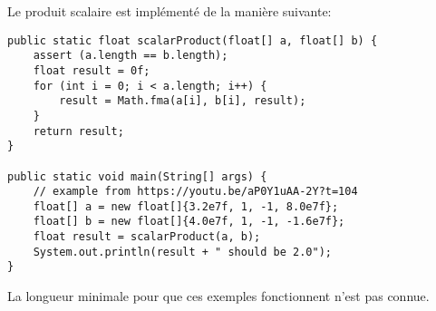 \begin{minipage2}
Le produit scalaire est implémenté de la manière suivante:

\begin{verbatim}
public static float scalarProduct(float[] a, float[] b) {
    assert (a.length == b.length);
    float result = 0f;
    for (int i = 0; i < a.length; i++) {
        result = Math.fma(a[i], b[i], result);
    }
    return result;
}

public static void main(String[] args) {
    // example from https://youtu.be/aP0Y1uAA-2Y?t=104
    float[] a = new float[]{3.2e7f, 1, -1, 8.0e7f};
    float[] b = new float[]{4.0e7f, 1, -1, -1.6e7f};
    float result = scalarProduct(a, b);
    System.out.println(result + " should be 2.0");
}
\end{verbatim}
\end{minipage2}

La longueur minimale pour que ces exemples fonctionnent n'est pas connue.